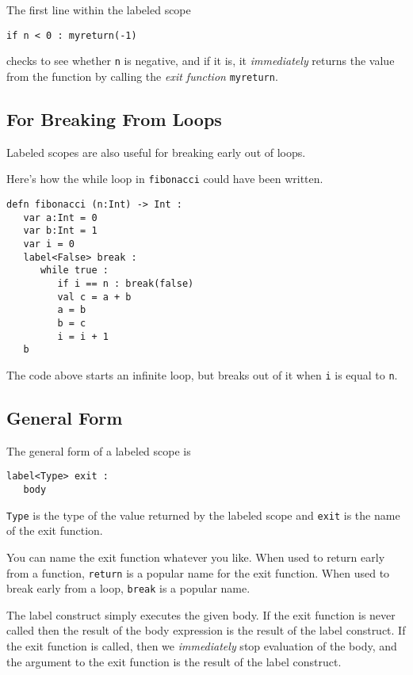 \documentclass[10pt,oneside]{book}
\begin{document}
The first line within the labeled scope
\begin{lstlisting}
if n < 0 : myreturn(-1)
\end{lstlisting}
checks to see whether \texttt{\frenchspacing n} is negative, and if it is, it {\em immediately} returns the value \texttt{} from the function by calling the {\em exit function} \texttt{\frenchspacing myreturn}. 

\subsection*{For Breaking From Loops}
Labeled scopes are also useful for breaking early out of loops.

Here's how the while loop in \texttt{\frenchspacing fibonacci} could have been written.
\begin{lstlisting}
defn fibonacci (n:Int) -> Int :
   var a:Int = 0
   var b:Int = 1
   var i = 0
   label<False> break :
      while true :
         if i == n : break(false)
         val c = a + b
         a = b
         b = c
         i = i + 1
   b
\end{lstlisting}
 
The code above starts an infinite loop, but breaks out of it when \texttt{\frenchspacing i} is equal to \texttt{\frenchspacing n}.

\subsection*{General Form}
The general form of a labeled scope is
\begin{lstlisting}
label<Type> exit :
   body
\end{lstlisting}
\texttt{\frenchspacing Type} is the type of the value returned by the labeled scope and \texttt{\frenchspacing exit} is the name of the exit function. 

You can name the exit function whatever you like. When used to return early from a function, \texttt{\frenchspacing return} is a popular name for the exit function. When used to break early from a loop, \texttt{\frenchspacing break} is a popular name.

The label construct simply executes the given body. If the exit function is never called then the result of the body expression is the result of the label construct. If the exit function is called, then we {\em immediately} stop evaluation of the body, and the argument to the exit function is the result of the label construct.
\end{document}
